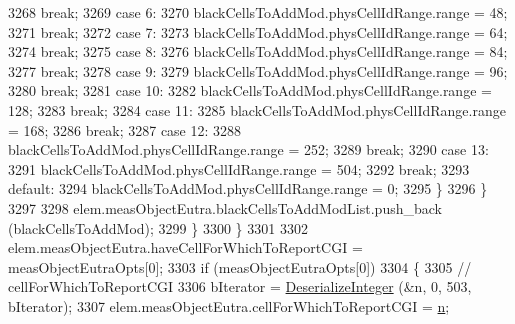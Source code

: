 \begin{DoxyCode}
3268                               \textcolor{keywordflow}{break};
3269                             \textcolor{keywordflow}{case} 6:
3270                               blackCellsToAddMod.physCellIdRange.range = 48;
3271                               \textcolor{keywordflow}{break};
3272                             \textcolor{keywordflow}{case} 7:
3273                               blackCellsToAddMod.physCellIdRange.range = 64;
3274                               \textcolor{keywordflow}{break};
3275                             \textcolor{keywordflow}{case} 8:
3276                               blackCellsToAddMod.physCellIdRange.range = 84;
3277                               \textcolor{keywordflow}{break};
3278                             \textcolor{keywordflow}{case} 9:
3279                               blackCellsToAddMod.physCellIdRange.range = 96;
3280                               \textcolor{keywordflow}{break};
3281                             \textcolor{keywordflow}{case} 10:
3282                               blackCellsToAddMod.physCellIdRange.range = 128;
3283                               \textcolor{keywordflow}{break};
3284                             \textcolor{keywordflow}{case} 11:
3285                               blackCellsToAddMod.physCellIdRange.range = 168;
3286                               \textcolor{keywordflow}{break};
3287                             \textcolor{keywordflow}{case} 12:
3288                               blackCellsToAddMod.physCellIdRange.range = 252;
3289                               \textcolor{keywordflow}{break};
3290                             \textcolor{keywordflow}{case} 13:
3291                               blackCellsToAddMod.physCellIdRange.range = 504;
3292                               \textcolor{keywordflow}{break};
3293                             \textcolor{keywordflow}{default}:
3294                               blackCellsToAddMod.physCellIdRange.range = 0;
3295                             \}
3296                         \}
3297 
3298                       elem.measObjectEutra.blackCellsToAddModList.push\_back (blackCellsToAddMod);
3299                     \}
3300                 \}
3301 
3302               elem.measObjectEutra.haveCellForWhichToReportCGI = measObjectEutraOpts[0];
3303               \textcolor{keywordflow}{if} (measObjectEutraOpts[0])
3304                 \{
3305                   \textcolor{comment}{// cellForWhichToReportCGI}
3306                   bIterator = \hyperlink{classns3_1_1Asn1Header_a49802c9af30018b078150e866b6ecae2}{DeserializeInteger} (&n, 0, 503, bIterator);
3307                   elem.measObjectEutra.cellForWhichToReportCGI = \hyperlink{namespacesample-rng-plot_aeb5ee5c431e338ef39b7ac5431242e1d}{n};

\end{DoxyCode}
